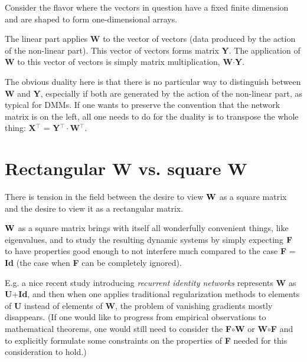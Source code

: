 \documentclass{article}
\begin{document}
\bigskip

Consider the flavor where the vectors in question have a fixed finite dimension and are shaped to form one-dimensional arrays.

\smallskip

The linear part applies {\bf W} to the vector of vectors (data produced by the action of the non-linear part). This vector of vectors forms matrix {\bf Y}. The application of {\bf W} to this vector of vectors is simply matrix multiplication, {\bf W}$\cdot${\bf Y}.

\bigskip

The obvious duality here is that there is no particular way to distinguish between {\bf W} and {\bf Y}, especially if both are
generated by the action of the non-linear part, as typical for DMMs. If one wants to preserve the convention that the network matrix is on the left, all one needs to do for the duality is to transpose the whole thing: {\bf X}$^{\top}$ = {\bf Y}$^{\top}\cdot${\bf W}$^{\top}$.

\section{Rectangular {\bf W} vs. square {\bf W}}


There is tension in the field between the desire to view $\bf W$ as a square matrix and the desire to view it as a rectangular matrix.

\bigskip

$\bf W$ as a square matrix brings with itself all wonderfully convenient things,
like eigenvalues, and to study the resulting dynamic systems by simply expecting $\bf F$ to have properties good enough to not interfere much compared to the case {\bf F} = {\bf Id} (the case when {\bf F} can be completely ignored).

\smallskip

E.g. a nice recent study introducing {\em recurrent identity networks} represents {\bf W} as {\bf U}+{\bf Id}, and then when one applies traditional
regularization methods to elements of {\bf U} instead of elements of {\bf W}, the problem of vanishing gradients mostly disappears. (If one would like to progress from empirical observations to mathematical theorems, one would still need to consider the {\bf F}$\circ${\bf W} or {\bf W}$\circ${\bf F} and to explicitly formulate some constraints on the properties of {\bf F} needed for this consideration to hold.)
\end{document}
